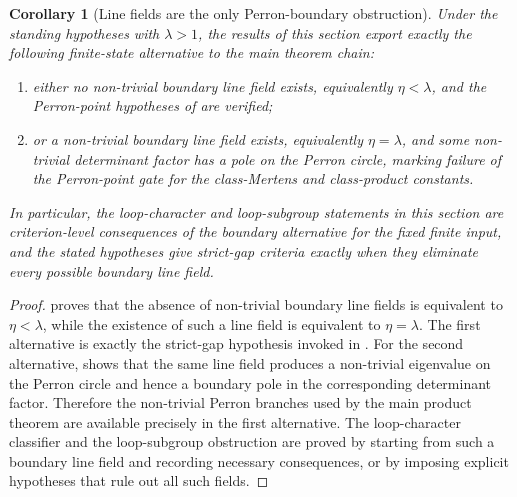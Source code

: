 \documentclass[11pt,a4paper]{amsart}
\theoremstyle{plain}
\newtheorem{corollary}[theorem]{Corollary}
\theoremstyle{definition}
\theoremstyle{remark}
\begin{document}
\begin{corollary}[Line fields are the only Perron-boundary obstruction]
  \label{cor:eta-gap-only-boundary-export}
  Under the standing hypotheses with \(\lambda>1\), the results of this
  section export exactly the following finite-state alternative to the main
  theorem chain:
  \begin{enumerate}[label=\textup{(\roman*)},leftmargin=*]
    \item either no non-trivial boundary line field exists, equivalently
      \(\eta<\lambda\), and the Perron-point hypotheses of
       are
      verified;
    \item or a non-trivial boundary line field exists, equivalently
      \(\eta=\lambda\), and some non-trivial determinant factor has a pole on
      the Perron circle, marking failure of the Perron-point gate for the
      class-Mertens and class-product constants.
  \end{enumerate}
  In particular, the loop-character and loop-subgroup statements in this
  section are criterion-level consequences of the boundary alternative for the
  fixed finite input, and the stated hypotheses give strict-gap criteria exactly
  when they eliminate every possible boundary line field.
\end{corollary}

\begin{proof}
   proves that the absence of
  non-trivial boundary line fields is equivalent to \(\eta<\lambda\), while
  the existence of such a line field is equivalent to \(\eta=\lambda\).  The
  first alternative is exactly the strict-gap hypothesis invoked in
  .  For the
  second alternative,  shows that the same
  line field produces a non-trivial eigenvalue on the Perron circle and hence
  a boundary pole in the corresponding determinant factor.  Therefore the
  non-trivial Perron branches used by the main product theorem are available
  precisely in the first alternative.  The loop-character classifier and the
  loop-subgroup obstruction are proved by starting from such a boundary line
  field and recording necessary consequences, or by imposing explicit
  hypotheses that rule out all such fields.
\end{proof}
\end{document}
